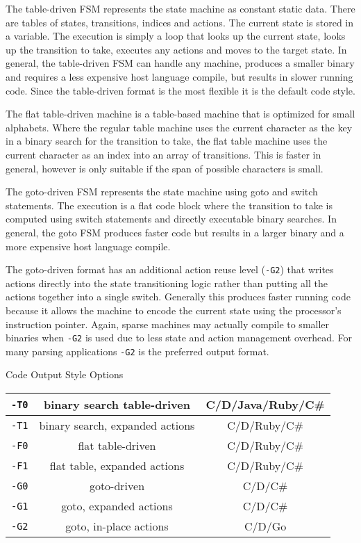 \documentclass[letterpaper,11pt,oneside]{book}
\begin{document}
The table-driven FSM represents the state machine as constant static data. There are
tables of states, transitions, indices and actions. The current state is
stored in a variable. The execution is simply a loop that looks up the current
state, looks up the transition to take, executes any actions and moves to the
target state. In general, the table-driven FSM can handle any machine, produces
a smaller binary and requires a less expensive host language compile, but
results in slower running code.  Since the table-driven format is the most
flexible it is the default code style.

The flat table-driven machine is a table-based machine that is optimized for
small alphabets. Where the regular table machine uses the current character as
the key in a binary search for the transition to take, the flat table machine
uses the current character as an index into an array of transitions. This is
faster in general, however is only suitable if the span of possible characters
is small.

The goto-driven FSM represents the state machine using goto and switch
statements. The execution is a flat code block where the transition to take is
computed using switch statements and directly executable binary searches.  In
general, the goto FSM produces faster code but results in a larger binary and a
more expensive host language compile.

The goto-driven format has an additional action reuse level (\verb|-G2|) that
writes actions directly into the state transitioning logic rather than putting
all the actions together into a single switch. Generally this produces faster
running code because it allows the machine to encode the current state using
the processor's instruction pointer. Again, sparse machines may actually
compile to smaller binaries when \verb|-G2| is used due to less state and
action management overhead. For many parsing applications \verb|-G2| is the
preferred output format.

\begin{center}

Code Output Style Options

\begin{tabular}{|c|c|c|}
\hline
\verb|-T0|&binary search table-driven&C/D/Java/Ruby/C\#\\
\hline
\verb|-T1|&binary search, expanded actions&C/D/Ruby/C\#\\
\hline
\verb|-F0|&flat table-driven&C/D/Ruby/C\#\\
\hline
\verb|-F1|&flat table, expanded actions&C/D/Ruby/C\#\\
\hline
\verb|-G0|&goto-driven&C/D/C\#\\
\hline
\verb|-G1|&goto, expanded actions&C/D/C\#\\
\hline
\verb|-G2|&goto, in-place actions&C/D/Go\\
\hline
\end{tabular}
\end{center}
\end{document}
